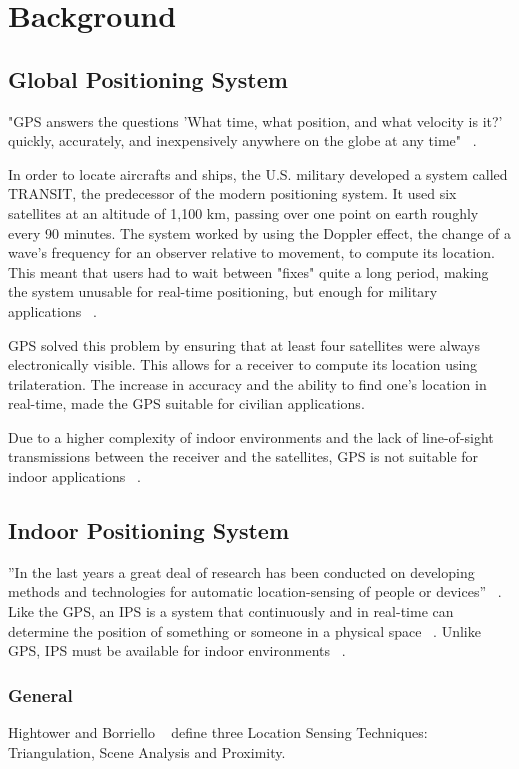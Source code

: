 \chapter{Background}

\section{Global Positioning System}
"GPS answers the questions 'What time, what position, and what velocity is it?' quickly, accurately, and inexpensively anywhere on the globe at any time" ~\cite{Hofmann}.  

In order to locate aircrafts and ships, the U.S. military developed a system called TRANSIT, the predecessor of the modern positioning system. It used six satellites at an altitude of 1,100 km, passing over one point on earth roughly every 90 minutes. The system worked by using the Doppler effect, the change of a wave's frequency for an observer relative to movement, to compute its location. This meant that users had to wait between "fixes" quite a long period, making the system unusable for real-time positioning, but enough for military applications ~\cite{Hofmann}. 

GPS solved this problem by ensuring that at least four satellites were always electronically visible. This allows for a receiver to compute its location using trilateration. The increase in accuracy and the ability to find one’s location in real-time, made the GPS suitable for civilian applications. 

Due to a higher complexity of indoor environments and the lack of line-of-sight transmissions between the receiver and the satellites, GPS is not suitable for indoor applications ~\cite{Gu}.

\section{Indoor Positioning System}
”In the last years a great deal of research has been conducted on developing methods and technologies for automatic location-sensing of people or devices” ~\cite{Flora}. Like the GPS, an IPS is a system that continuously and in real-time can determine the position of something or someone in a physical space ~\cite{Depsey}. Unlike GPS, IPS must be available for indoor environments ~\cite{Gu}. 

\subsection{General}
Hightower and Borriello ~\cite{Hightower} define three Location Sensing Techniques: Triangulation, Scene Analysis and Proximity. 

